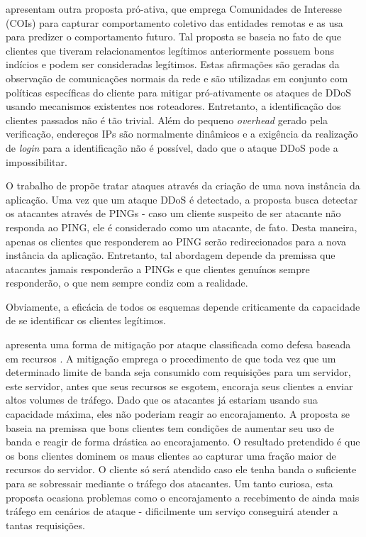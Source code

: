 \documentclass[a4paper, 12pt]{article}
\begin{document}
\cite{Verkaik:2006:PCD:1162666.1162673} apresentam outra proposta pró-ativa, que emprega Comunidades de Interesse (COIs) para capturar comportamento coletivo das entidades remotas e as usa para predizer o comportamento futuro. Tal proposta se baseia no fato de que clientes que tiveram relacionamentos legítimos anteriormente possuem bons indícios e podem ser consideradas legítimos. Estas afirmações são geradas da observação de comunicações normais da rede e são utilizadas em conjunto com políticas específicas do cliente para mitigar pró-ativamente os ataques de DDoS usando mecanismos existentes nos roteadores. 
%
Entretanto, a identificação dos clientes passados não é tão trivial. Além do pequeno \emph{overhead} gerado pela verificação, endereços IPs são normalmente dinâmicos e a exigência da realização de \emph{login} para a identificação não é possível, dado que o ataque DDoS pode a impossibilitar.


O trabalho de \cite{Bakshi:10} propõe tratar ataques através da criação de uma nova instância da aplicação. Uma vez que um ataque DDoS é detectado, a proposta busca detectar os atacantes através de PINGs - caso um cliente suspeito de ser atacante não responda ao PING, ele é considerado como um atacante, de fato. Desta maneira, apenas os clientes que responderem ao PING serão 
redirecionados para a nova instância da aplicação. Entretanto, tal abordagem depende da premissa que atacantes jamais responderão a PINGs e que clientes genuínos sempre responderão, o que nem sempre condiz com a realidade.

Obviamente, a eficácia de todos os esquemas depende criticamente da capacidade de se identificar os clientes legítimos. 



\cite{Walfish:2010:DDO:1731060.1731063} apresenta uma forma de mitigação por ataque classificada como defesa baseada em recursos \cite{Dwork:1992:PVP:646757.705669}. A mitigação emprega o procedimento de que toda vez que um determinado limite de banda seja consumido com requisições para um servidor, este servidor, antes que seus recursos se esgotem, encoraja seus clientes a enviar altos volumes de tráfego. Dado que os atacantes já estariam usando sua capacidade máxima, eles não poderiam reagir ao encorajamento. A proposta se baseia na premissa que bons clientes tem condições de aumentar seu uso de banda e reagir de forma drástica ao encorajamento. O resultado pretendido é que os bons clientes dominem os maus clientes ao capturar uma fração maior de recursos do servidor. O cliente só será atendido caso ele tenha banda o suficiente para se sobressair mediante o tráfego dos atacantes. Um tanto curiosa, esta proposta ocasiona problemas como %
o encorajamento a recebimento de ainda mais tráfego em cenários de ataque - 
dificilmente um serviço conseguirá atender a tantas requisições. 
\end{document}
